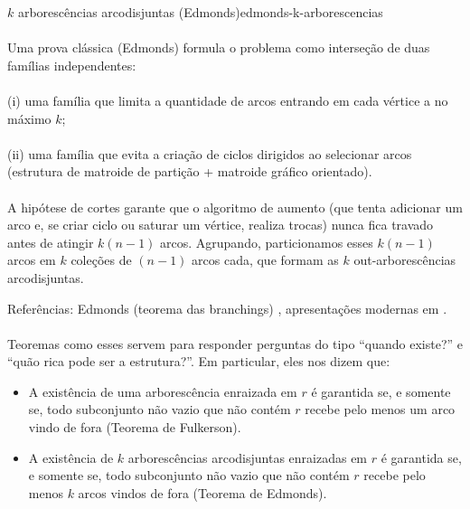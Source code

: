 \documentclass[12pt,a4paper]{article}
\def\emph#1{#1}%
\begin{document}
\begin{teobox}{$k$ arborescências arcodisjuntas (Edmonds)}{edmonds-k-arborescencias}
    \paragraph{}
    Uma prova clássica (Edmonds) formula o problema como interseção de duas famílias independentes:

    \paragraph{}
    (i) uma família que limita a quantidade de arcos entrando em cada vértice a no máximo $k$;

    \paragraph{}
    (ii) uma família que evita a criação de ciclos dirigidos ao selecionar arcos (estrutura de matroide de partição + matroide gráfico orientado).

    \paragraph{}
    A hipótese de cortes garante que o algoritmo de aumento (que tenta adicionar um arco e, se criar ciclo ou saturar um vértice, realiza trocas) nunca fica travado antes de atingir $k(n-1)$ arcos. Agrupando, particionamos esses $k(n-1)$ arcos em $k$ coleções de $(n-1)$ arcos cada, que formam as $k$ out-arborescências arcodisjuntas.

    \medskip
    \emph{Referências:} Edmonds (teorema das branchings) \cite{edmonds1967optimum}, apresentações modernas em \cite{schrijver2003comb}.
    \label{thm:edmonds-disjoint-arborescencias}
\end{teobox}

\paragraph{}
Teoremas como esses servem para responder perguntas do tipo “quando existe?” e “quão rica pode ser a estrutura?”. Em particular, eles nos dizem que:
\begin{itemize}\setlength{\itemsep}{2pt}
    \item A existência de uma arborescência enraizada em \(r\) é garantida se, e somente se, todo subconjunto não vazio que não contém \(r\) recebe pelo menos um arco vindo de fora (Teorema de Fulkerson).
    \item A existência de \(k\) arborescências arcodisjuntas enraizadas em \(r\) é garantida se, e somente se, todo subconjunto não vazio que não contém \(r\) recebe pelo menos \(k\) arcos vindos de fora (Teorema de Edmonds).
\end{itemize}
\end{document}
